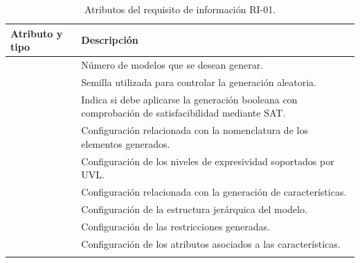 \begin{longtable}{@{}P{5.3cm} P{\dimexpr\textwidth-5.3cm-2\tabcolsep\relax}@{}}
\toprule
\textbf{Atributo y tipo} & \textbf{Descripción} \\
\midrule
\endhead


 & Número de modelos que se desean generar. \\

\midrule
{} & Semilla utilizada para controlar la generación aleatoria. \\

\midrule
{} &
Indica si debe aplicarse la generación booleana con comprobación de
satisfacibilidad mediante SAT. \\

\midrule
{} & Configuración relacionada con la nomenclatura de los elementos generados. \\

\midrule
{} & Configuración de los niveles de expresividad soportados por UVL. \\

\midrule
{} & Configuración relacionada con la generación de características. \\

\midrule
{} & Configuración de la estructura jerárquica del modelo. \\

\midrule
{} & Configuración de las restricciones generadas. \\

\midrule
{} & Configuración de los atributos asociados a las características. \\

\bottomrule
\caption{Atributos del requisito de información RI-01.}
\label{tab:ri-fmgenerator-model}
\end{longtable}


